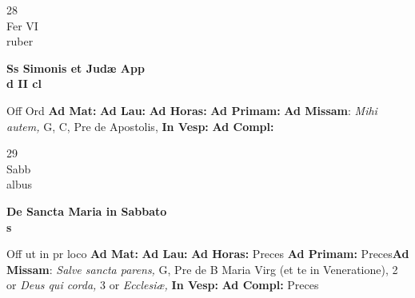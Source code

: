 \documentclass[10pt, openany]{book}
\begin{document}
    \begin{center}
        \begin{minipage}{3.5in}
            \vspace{2em}
            \begin{minipage}{0.5in}
                {\Huge 28} \\
                {\normalsize Fer VI} \\
                {\normalsize ruber}
            \end{minipage}
            \begin{minipage}{3.0in}
                \textbf{ \large Ss Simonis et Judæ App \\
                \textnormal{\normalsize d II cl}} \\ 
            \end{minipage}
            \begin{justify}Off Ord
                \textbf{Ad Mat: }
                \textbf{Ad Lau: }
                \textbf{Ad Horas: }
                \textbf{Ad Primam: }\textbf{Ad Missam}: \textit{Mihi autem,} G, C, Pre de Apostolis,  
                \textbf{In Vesp: }
                \textbf{Ad Compl: }
            \end{justify}
        \end{minipage}
    \end{center}

    \begin{center}
        \begin{minipage}{3.5in}
            \vspace{2em}
            \begin{minipage}{0.5in}
                {\Huge 29} \\
                {\normalsize Sabb} \\
                {\normalsize albus}
            \end{minipage}
            \begin{minipage}{3.0in}
                \textbf{ \large De Sancta Maria in Sabbato \\
                \textnormal{\normalsize s}} \\ 
            \end{minipage}
            \begin{justify}Off ut in pr loco
                \textbf{Ad Mat: }
                \textbf{Ad Lau: }
                \textbf{Ad Horas: }Preces
                \textbf{Ad Primam: }Preces\textbf{Ad Missam}: \textit{Salve sancta parens,} G, Pre de B Maria Virg (et te in Veneratione), 2 or \textit{Deus qui corda,} 3 or \textit{Ecclesiæ,}  
                \textbf{In Vesp: }
                \textbf{Ad Compl: }Preces
            \end{justify}
        \end{minipage}
    \end{center}
\end{document}
